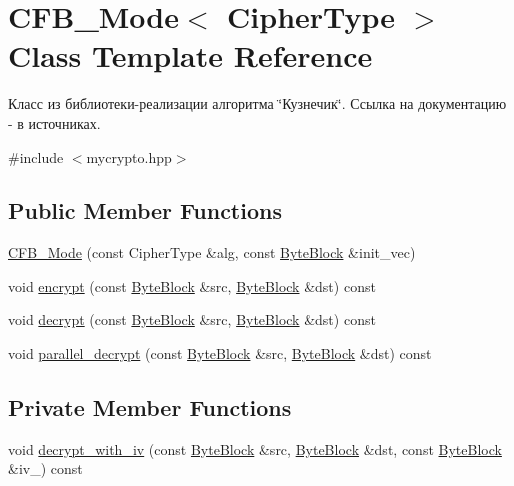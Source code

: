 \hypertarget{class_c_f_b___mode}{}\section{C\+F\+B\+\_\+\+Mode$<$ Cipher\+Type $>$ Class Template Reference}
\label{class_c_f_b___mode}


Класс из библиотеки-\/реализации алгоритма \char`\"{}Кузнечик\char`\"{}. Ссылка на документацию -\/ в источниках.  




{\ttfamily \#include $<$mycrypto.\+hpp$>$}

\subsection*{Public Member Functions}
\begin{DoxyCompactItemize}
\item 
\hyperlink{class_c_f_b___mode_a191bd9146ea20372148bbd10f25cb5d5}{C\+F\+B\+\_\+\+Mode} (const Cipher\+Type \&alg, const \hyperlink{class_byte_block}{Byte\+Block} \&init\+\_\+vec)
\item 
void \hyperlink{class_c_f_b___mode_a8090129450a70b0d7bddb34b063574bd}{encrypt} (const \hyperlink{class_byte_block}{Byte\+Block} \&src, \hyperlink{class_byte_block}{Byte\+Block} \&dst) const
\item 
void \hyperlink{class_c_f_b___mode_a26084270b140d8f353d57dc1956a957b}{decrypt} (const \hyperlink{class_byte_block}{Byte\+Block} \&src, \hyperlink{class_byte_block}{Byte\+Block} \&dst) const
\item 
void \hyperlink{class_c_f_b___mode_af15d9bf13d661e6c3a3d99c136a41150}{parallel\+\_\+decrypt} (const \hyperlink{class_byte_block}{Byte\+Block} \&src, \hyperlink{class_byte_block}{Byte\+Block} \&dst) const
\end{DoxyCompactItemize}
\subsection*{Private Member Functions}
\begin{DoxyCompactItemize}
\item 
void \hyperlink{class_c_f_b___mode_a8dca3882db394b8b87947337bdb3c9c1}{decrypt\+\_\+with\+\_\+iv} (const \hyperlink{class_byte_block}{Byte\+Block} \&src, \hyperlink{class_byte_block}{Byte\+Block} \&dst, const \hyperlink{class_byte_block}{Byte\+Block} \&iv\+\_\+) const
\end{DoxyCompactItemize}
